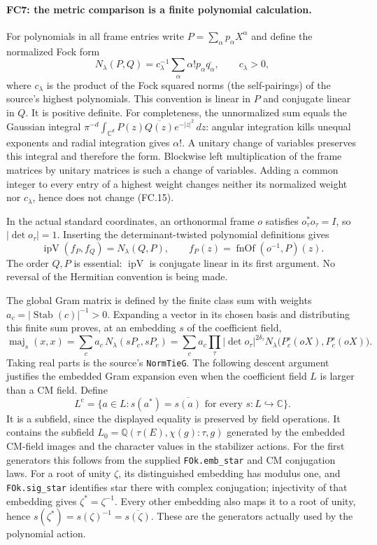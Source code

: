 \paragraph{FC7: the metric comparison is a finite polynomial calculation.}
For polynomials in all frame entries write
$P=\sum_\alpha p_\alpha X^\alpha$ and define the normalized Fock form
\[
 N_\lambda(P,Q)=c_\lambda^{-1}
       \sum_\alpha\alpha!p_\alpha\overline{q_\alpha},
 \qquad c_\lambda>0,                                  \tag{FC.15}
\]
where $c_\lambda$ is the product of the Fock squared norms (the
self-pairings) of the source's highest polynomials. This convention is linear in $P$ and conjugate
linear in $Q$. It is positive definite. For completeness, the unnormalized
sum equals the Gaussian integral
$\pi^{-d}\int_{\mathbb C^d}P(z)\overline{Q(z)}e^{-|z|^2}\,dz$:
angular integration kills unequal exponents and radial integration gives
$\alpha!$. A unitary change of variables preserves this integral and
therefore the form. Blockwise left multiplication of the frame matrices
by unitary matrices is such a change of variables. Adding a common
integer to every entry of a highest weight changes neither its
normalized weight nor $c_\lambda$, hence does not change (FC.15).

In the actual standard coordinates, an orthonormal frame $o$ satisfies
$o_\tau^*o_\tau=I$, so $|\det o_\tau|=1$. Inserting the
determinant-twisted polynomial definitions gives
\[
 \operatorname{ipV}(f_P,f_Q)=N_\lambda(Q,P),
 \qquad f_P(z)=\operatorname{fnOf}(o^{-1},P)(z).
 \tag{FC.16}
\]
The order $Q,P$ is essential: $\operatorname{ipV}$ is conjugate linear
in its first argument. No reversal of the Hermitian convention is
being made.

The global Gram matrix is defined by the finite class sum with weights
$a_c=|\operatorname{Stab}(c)|^{-1}>0$. Expanding a vector in its
chosen basis and distributing this finite sum proves, at an embedding
$s$ of the coefficient field,
\[
 \operatorname{maj}_s(x,x)
   =\sum_c a_c\,N_\lambda(sP_c,sP_c)
   =\sum_c a_c\prod_\tau|\det o_\tau|^{2\delta_\tau}
       N_\lambda\bigl(P_c^s(oX),P_c^s(oX)\bigr).
 \tag{FC.17}
\]
Taking real parts is the source's \texttt{NormTieG}. The following
descent argument justifies the embedded Gram expansion even when the
coefficient field $L$ is larger than a CM field. Define
\[
 L^{\mathrm c}=\{a\in L:
    s(a^*)=\overline{s(a)}\text{ for every }s:L\hookrightarrow\mathbb C\}.
 \tag{FC.17a}
\]
It is a subfield, since the displayed equality is preserved by field
operations. It contains the subfield
$L_0=\mathbb Q(\tau(E),\chi(g):\tau,g)$ generated by the embedded
CM-field images and the character values in the stabilizer actions.
For the first generators this follows from the supplied
\texttt{FOk.emb\_star} and CM conjugation laws. For a root of unity
$\zeta$, its distinguished embedding has modulus one, and
\texttt{FOk.sig\_star} identifies star there with complex conjugation;
injectivity
of that embedding gives $\zeta^*=\zeta^{-1}$. Every other embedding
also maps it to a root of unity, hence
$s(\zeta^*)=s(\zeta)^{-1}=\overline{s(\zeta)}$.
These are the generators actually used by the polynomial action.

